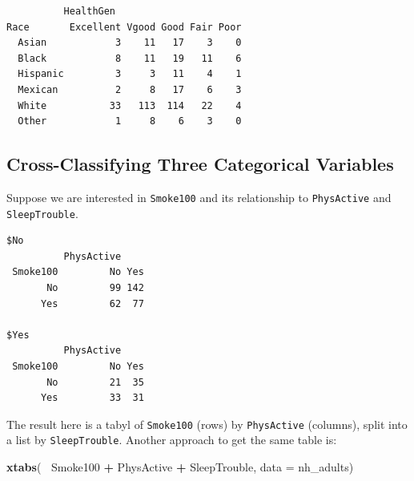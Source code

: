 \documentclass[
]{book}
\newenvironment{Shaded}{\begin{snugshade}}{\end{snugshade}}
\newcommand{\DataTypeTok}[1]{\textcolor[rgb]{0.13,0.29,0.53}{#1}}
\newcommand{\KeywordTok}[1]{\textcolor[rgb]{0.13,0.29,0.53}{\textbf{#1}}}
\newcommand{\NormalTok}[1]{#1}
\newcommand{\OperatorTok}[1]{\textcolor[rgb]{0.81,0.36,0.00}{\textbf{#1}}}
\newcommand{\StringTok}[1]{\textcolor[rgb]{0.31,0.60,0.02}{#1}}
\begin{document}
\begin{verbatim}
          HealthGen
Race       Excellent Vgood Good Fair Poor
  Asian            3    11   17    3    0
  Black            8    11   19   11    6
  Hispanic         3     3   11    4    1
  Mexican          2     8   17    6    3
  White           33   113  114   22    4
  Other            1     8    6    3    0
\end{verbatim}

\hypertarget{cross-classifying-three-categorical-variables}{%
\subsection{Cross-Classifying Three Categorical Variables}\label{cross-classifying-three-categorical-variables}}

Suppose we are interested in \texttt{Smoke100} and its relationship to \texttt{PhysActive} and \texttt{SleepTrouble}.

\begin{Shaded}
\end{Shaded}

\begin{verbatim}
$No
          PhysActive    
 Smoke100         No Yes
       No         99 142
      Yes         62  77

$Yes
          PhysActive    
 Smoke100         No Yes
       No         21  35
      Yes         33  31
\end{verbatim}

The result here is a tabyl of \texttt{Smoke100} (rows) by \texttt{PhysActive} (columns), split into a list by \texttt{SleepTrouble}. Another approach to get the same table is:

\begin{Shaded}
\begin{Highlighting}[]
\KeywordTok{xtabs}\NormalTok{(}\OperatorTok{~}\StringTok{ }\NormalTok{Smoke100 }\OperatorTok{+}\StringTok{ }\NormalTok{PhysActive }\OperatorTok{+}\StringTok{ }\NormalTok{SleepTrouble, }\DataTypeTok{data =}\NormalTok{ nh_adults)}
\end{Highlighting}
\end{Shaded}
\end{document}
